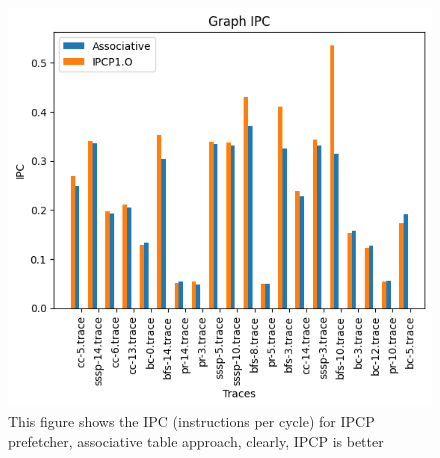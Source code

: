 \documentclass[conference]{IEEEtran}
\begin{document}
\begin{figure}
\includegraphics[scale=0.5]{Images/associative.png}
\caption{This figure shows the IPC (instructions per cycle) for IPCP prefetcher, associative table approach, clearly, IPCP is better}
\label{graph_rel_ipc_ass}
\end{figure}
\end{document}
